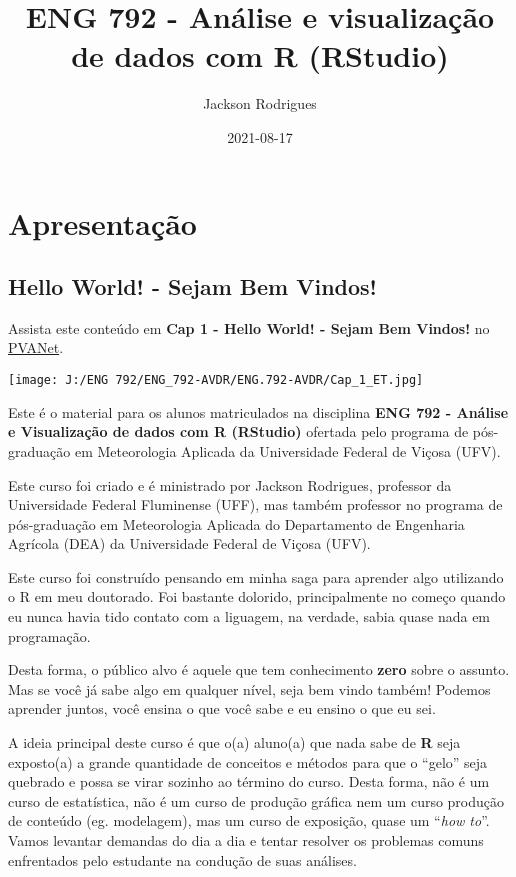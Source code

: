 \documentclass[
]{book}
\title{ENG 792 - Análise e visualização de dados com R (RStudio)}
\author{Jackson Rodrigues}
\date{2021-08-17}
\begin{document}
\maketitle

{
\setcounter{tocdepth}{1}
\tableofcontents
}
\hypertarget{apresentauxe7uxe3o}{%
\chapter{Apresentação}\label{apresentauxe7uxe3o}}

\hypertarget{hello-world---sejam-bem-vindos}{%
\section{Hello World! - Sejam Bem Vindos!}\label{hello-world---sejam-bem-vindos}}

Assista este conteúdo em \textbf{Cap 1 - Hello World! - Sejam Bem Vindos!} no \href{https://www2.cead.ufv.br/sistemas/pvanet/geral/login.php}{PVANet}.

\texttt{[image: J:/ENG 792/ENG\_792-AVDR/ENG.792-AVDR/Cap\_1\_ET.jpg]}

Este é o material para os alunos matriculados na disciplina \textbf{ENG 792 - Análise e Visualização de dados com R (RStudio)} ofertada pelo programa de pós-graduação em Meteorologia Aplicada da Universidade Federal de Viçosa (UFV).

Este curso foi criado e é ministrado por Jackson Rodrigues, professor da Universidade Federal Fluminense (UFF), mas também professor no programa de pós-graduação em Meteorologia Aplicada do Departamento de Engenharia Agrícola (DEA) da Universidade Federal de Viçosa (UFV).

Este curso foi construído pensando em minha saga para aprender algo utilizando o R em meu doutorado. Foi bastante dolorido, principalmente no começo quando eu nunca havia tido contato com a liguagem, na verdade, sabia quase nada em programação.

Desta forma, o público alvo é aquele que tem conhecimento \textbf{zero} sobre o assunto. Mas se você já sabe algo em qualquer nível, seja bem vindo também! Podemos aprender juntos, você ensina o que você sabe e eu ensino o que eu sei.

A ideia principal deste curso é que o(a) aluno(a) que nada sabe de \textbf{R} seja exposto(a) a grande quantidade de conceitos e métodos para que o ``gelo'' seja quebrado e possa se virar sozinho ao término do curso. Desta forma, não é um curso de estatística, não é um curso de produção gráfica nem um curso produção de conteúdo (eg. modelagem), mas um curso de exposição, quase um ``\emph{how to}''. Vamos levantar demandas do dia a dia e tentar resolver os problemas comuns enfrentados pelo estudante na condução de suas análises.
\end{document}
